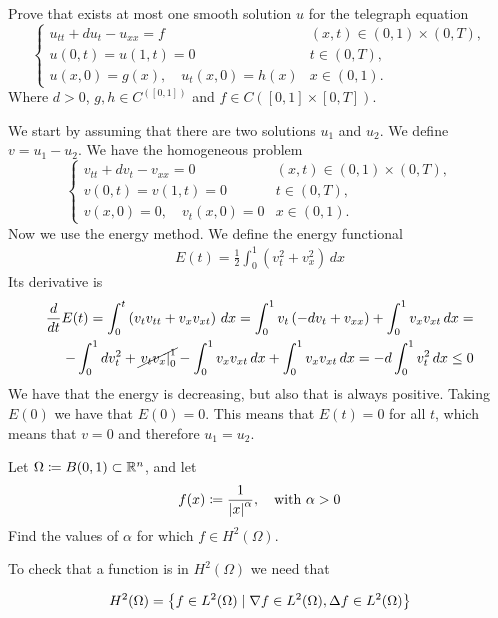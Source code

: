 \begin{exercise}
    Prove that exists at most one smooth solution \(u\) for the telegraph equation
    \[
        \begin{cases}
            u_{tt} + d u_t - u_{xx} = f & (x, t) \in (0,1) \times (0, T), \\
            u(0, t) = u(1, t) = 0 & t \in (0, T), \\
            u(x, 0) = g(x), \quad u_t(x, 0) = h(x) & x \in (0, 1).
        \end{cases}
    \]
    Where \(d > 0\), \(g, h \in C^([0, 1])\) and \(f \in C([0, 1] \times [0, T])\).
\end{exercise}
We start by assuming that there are two solutions \(u_1\) and \(u_2\). We define \(v = u_1 - u_2\). We have the homogeneous problem
\[
    \begin{cases}
        v_{tt} + d v_t - v_{xx} = 0 & (x, t) \in (0,1) \times (0, T), \\
        v(0, t) = v(1, t) = 0 & t \in (0, T), \\
        v(x, 0) = 0, \quad v_t(x, 0) = 0 & x \in (0, 1).
    \end{cases}
\]
Now we use the energy method. We define the energy functional
\[
    \begin{split}
        E(t) = \frac{1}{2} \int_0^1 \left(v_t^2 + v_x^2\right) \, dx
    \end{split}
\]
Its derivative is 
\[
    \begin{split}
        \frac{d}{dt} E(t) = \int_0^t \left(v_t v_{tt} + v_x v_{xt}\right) \, dx = \int_0^1 v_t\left(-d v_t + v_{xx}\right) + \int_0^1 v_x v_{xt} \, dx = \\
        -\int_0^1 d v_t^2 + \cancel{\left. v_t v_x \right|_0^1} - \int_0^1 v_x v_{xt} \, dx  + \int_0^1 v_x v_{xt} \, dx = -d \int_0^1 v_t^2 \, dx \leq 0
    \end{split}
\]
We have that the energy is decreasing, but also that is always positive. Taking \(E(0)\) we have that \(E(0) = 0\). This means that \(E(t) = 0\) for all \(t\), which means that \(v = 0\) and therefore \(u_1 = u_2\).  
\newpage
\begin{exercise}
    Let \(\Omega \coloneqq B(0, 1) \subset \mathbb{R}^n\), and let 
    \[
        f(x) \coloneqq \frac{1}{\abs{x}^\alpha}, \quad \text{with } \alpha > 0
    \]
    Find the values of \(\alpha\) for which \(f \in H^2(\Omega)\).
\end{exercise}
To check that a function is in \(H^2(\Omega)\) we need that
\begin{remark}
    \[
        H^2(\Omega) = \left\{ f \in L^2(\Omega) \mid \nabla f \in L^2(\Omega), \Delta f \in L^2(\Omega) \right\}
    \]  
\end{remark}
